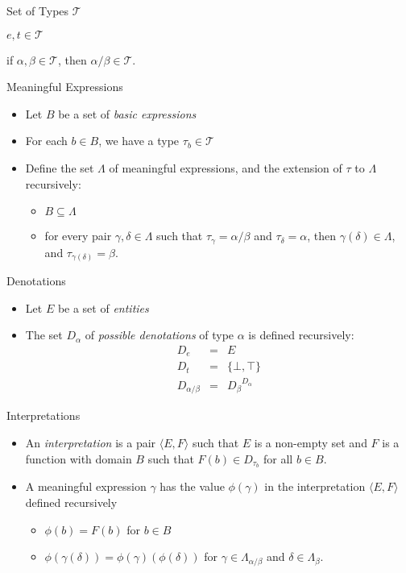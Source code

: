 \documentclass{beamer}
\newlength{\wideitemsep}
\let\olditem\item
\renewcommand{\item}{\setlength{\itemsep}{\wideitemsep}\olditem}
\begin{document}
\begin{frame}{Set of Types $\mathcal{T}$}
\begin{description}
\item [Basic types:] $e,t\in \mathcal{T}$
\item[Complex types:]  if $\alpha, \beta\in \mathcal{T}$, then $\alpha/\beta\in \mathcal{T}$.
\end{description}
\end{frame}

\begin{frame}{Meaningful Expressions}
\begin{itemize}
\item Let $B$ be a set of \emph{basic expressions}
\item For each $b\in B$, we have a type $\tau_b\in \mathcal{T}$
\item Define the set $\Lambda$ of meaningful expressions, and the extension of $\tau$ to $\Lambda$ recursively:
\begin{itemize}
\item $B\subseteq \Lambda$
\item for every pair $\gamma,\delta\in \Lambda$ such that $\tau_\gamma
  = \alpha/\beta$ and $\tau_\delta = \alpha$, then $\gamma(\delta)\in
  \Lambda$, and $\tau_{\gamma(\delta)} = \beta$.
\end{itemize}
\end{itemize}
\end{frame}

\begin{frame}{Denotations}
\begin{itemize}
\item Let $E$ be a set of \emph{entities}
\item The set $D_\alpha$ of \emph{possible denotations} of type $\alpha$ is
defined recursively:
\begin{eqnarray*}
D_e &=& E\\
D_t &=& \{\bot,\top\}\\
D_{\alpha/\beta} &=& {D_\beta}^{D_\alpha}
\end{eqnarray*}
\end{itemize}
\end{frame}

\begin{frame}{Interpretations}
  \begin{itemize}
  \item An \emph{interpretation} is a pair $\langle E,
    F\rangle$ such that $E$ is a non-empty set and $F$ is a function with
    domain $B$ such that $F(b) \in D_{\tau_b}$ for all $b\in B$.
  \item A meaningful expression $\gamma$ has the value $\phi(\gamma)$ in the
    interpretation $\langle E, F\rangle$ defined recursively
    \begin{itemize}
    \item $\phi(b) = F(b)$ for $b\in B$
    \item $\phi(\gamma(\delta)) = \phi(\gamma)(\phi(\delta))$ for $\gamma
      \in \Lambda_{\alpha/\beta}$ and $\delta \in \Lambda_\beta$.
    \end{itemize}
  \end{itemize}
\end{frame}
\end{document}
